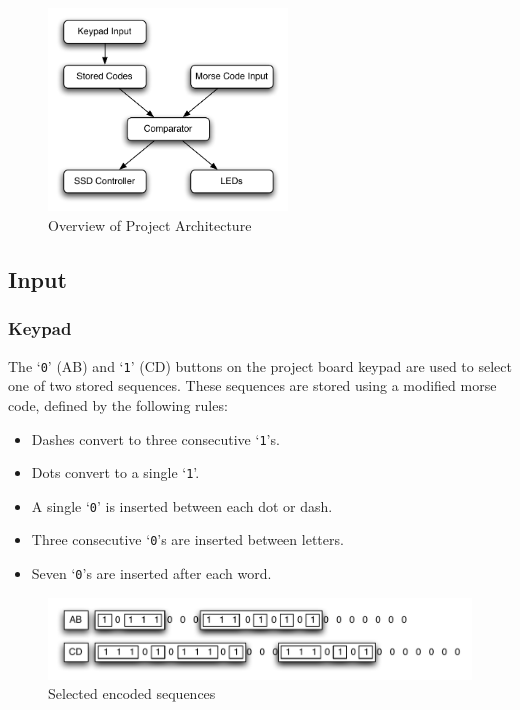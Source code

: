 \documentclass[11pt,letterpaper,titlepage]{article}
\begin{document}
\begin{figure}[!htb]
	\begin{center}
		\includegraphics[width=2.5in]{graphics/highlevelarchitecture.pdf}
		\caption{Overview of Project Architecture}
		\label{fig:Overview}
	\end{center}
\end{figure}

\subsection{Input}
\subsubsection{Keypad}
The `\texttt{0}' (AB) and `\texttt{1}' (CD) buttons on the project board keypad are used to select one of two stored sequences. These sequences are stored using a modified morse code, defined by the following rules:
\begin{itemize}
\small
\item Dashes convert to three consecutive `\texttt{1}'s.
\item Dots convert to a single `\texttt{1}'.
\item A single `\texttt{0}' is inserted between each dot or dash.
\item Three consecutive `\texttt{0}'s are inserted between letters.
\item Seven `\texttt{0}'s are inserted after each word.
\end{itemize}

\begin{figure}[!htb]
	\includegraphics[width=5in]{graphics/morseencoded.pdf}
	\caption{Selected encoded sequences}
	\label{fig:MorseEncoded}
\end{figure}
\end{document}
